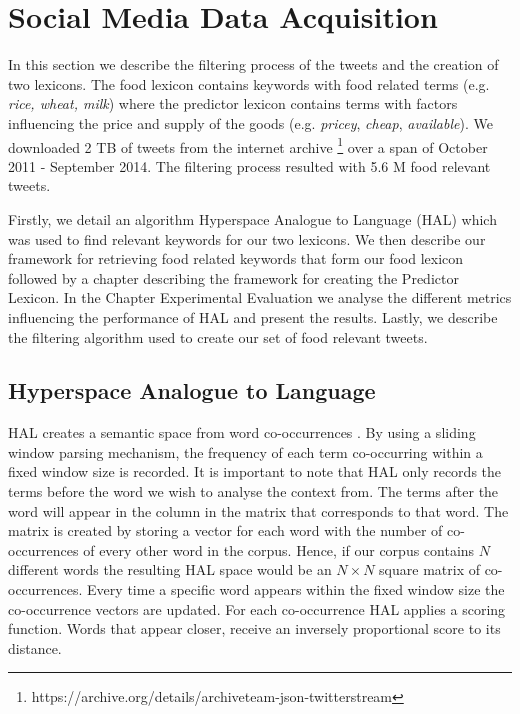 

\let\cleardoublepage\clearpage

\chapter{Social Media Data Acquisition}
In this section we describe the filtering process of the tweets and the creation of two lexicons. The food lexicon contains keywords with food related terms (e.g. \emph {rice, wheat, milk}) where the predictor lexicon contains 
terms with factors influencing the price and supply of the goods (e.g. \emph{pricey}, \emph {cheap}, \emph{available}). We downloaded 2 TB of tweets from the internet archive \footnote{https://archive.org/details/archiveteam-json-twitterstream} over a span of October 2011 - September 2014.  The filtering process resulted with 5.6 M food relevant tweets.

Firstly, we detail an algorithm Hyperspace Analogue to Language (HAL)  \cite{lund96} which was used to find relevant keywords for our two lexicons. We then describe our framework for retrieving food related keywords that form our food lexicon followed by a chapter describing the framework for creating the Predictor Lexicon. In the Chapter Experimental Evaluation we analyse the different metrics influencing the performance of HAL and present the results. Lastly, we describe the filtering algorithm used to create our set of food relevant tweets.


\section{Hyperspace Analogue to Language}

HAL creates a semantic space from word co-occurrences \cite{lund96}. By using a sliding window parsing mechanism, the frequency of each term co-occurring within a fixed window size is recorded.  It is important to note that HAL only records the terms before the word we wish to analyse the context from. The terms after the word will appear in the column in the matrix that corresponds to that word.  The matrix is created by storing a vector for each word with the number of co-occurrences of every other word in the corpus. Hence, if our corpus contains $N$ different words the resulting HAL space would be an $N \times N$ square matrix of co-occurrences. Every time a specific word appears within the fixed window size the co-occurrence vectors are updated. For each co-occurrence HAL applies a scoring function. Words that appear closer, receive an inversely proportional score to its distance.

